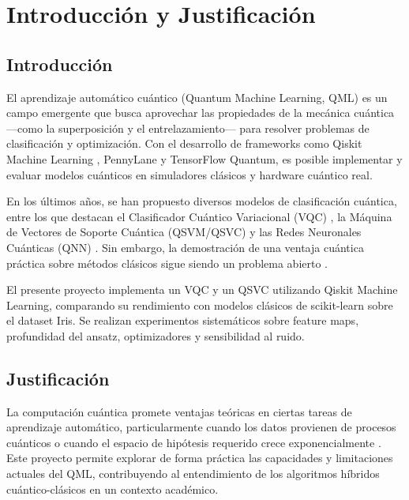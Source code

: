 \section{Introducci\'on y Justificaci\'on}

\subsection{Introducci\'on}

El aprendizaje autom\'atico cu\'antico (Quantum Machine Learning, QML) es un campo emergente que busca aprovechar las propiedades de la mec\'anica cu\'antica ---como la superposici\'on y el entrelazamiento--- para resolver problemas de clasificaci\'on y optimizaci\'on. Con el desarrollo de frameworks como Qiskit Machine Learning \citep{qiskit2024}, PennyLane y TensorFlow Quantum, es posible implementar y evaluar modelos cu\'anticos en simuladores cl\'asicos y hardware cu\'antico real.

En los \'ultimos a\~nos, se han propuesto diversos modelos de clasificaci\'on cu\'antica, entre los que destacan el Clasificador Cu\'antico Variacional (VQC) \citep{havlicek2019}, la M\'aquina de Vectores de Soporte Cu\'antica (QSVM/QSVC) \citep{rebentrost2014} y las Redes Neuronales Cu\'anticas (QNN) \citep{farhi2018}. Sin embargo, la demostraci\'on de una ventaja cu\'antica pr\'actica sobre m\'etodos cl\'asicos sigue siendo un problema abierto \citep{cerezo2021, larocca2025}.

El presente proyecto implementa un VQC y un QSVC utilizando Qiskit Machine Learning, comparando su rendimiento con modelos cl\'asicos de scikit-learn sobre el dataset Iris. Se realizan experimentos sistem\'aticos sobre feature maps, profundidad del ansatz, optimizadores y sensibilidad al ruido.

\subsection{Justificaci\'on}

La computaci\'on cu\'antica promete ventajas te\'oricas en ciertas tareas de aprendizaje autom\'atico, particularmente cuando los datos provienen de procesos cu\'anticos o cuando el espacio de hip\'otesis requerido crece exponencialmente \citep{huang2021}. Este proyecto permite explorar de forma pr\'actica las capacidades y limitaciones actuales del QML, contribuyendo al entendimiento de los algoritmos h\'ibridos cu\'antico-cl\'asicos en un contexto acad\'emico.

